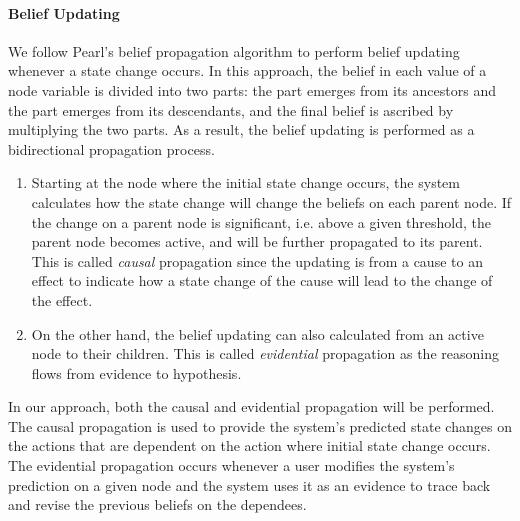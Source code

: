 \paragraph*{Belief Updating} %
\label{par:belief_updating}
We follow Pearl’s belief propagation algorithm \cite{pearl1988probabilistic} to perform belief updating whenever a state change occurs. In this approach, the belief in each value of a node variable is divided into two parts: the part emerges from its ancestors and the part emerges from its descendants, and the final belief is ascribed by multiplying the two parts. As a result, the belief updating is performed as a bidirectional propagation process. 
\begin{enumerate}
	\item Starting at the node where the initial state change occurs, the system calculates how the state change will change the beliefs on each parent node. If the change on a parent node is significant, i.e. above a given threshold, the parent node becomes active, and will be further propagated to its parent. This is called \emph{causal} propagation since the updating is from a cause to an effect to indicate how a state change of the cause will lead to the change of the effect. 
	\item On the other hand, the belief updating can also calculated from an active node to their children. This is called \emph{evidential} propagation as the reasoning flows from evidence to hypothesis.
\end{enumerate}

In our approach, both the causal and evidential propagation will be performed. The causal propagation is used to provide the system's predicted state changes on the actions that are dependent on the action where initial state change occurs. The evidential propagation occurs whenever a user modifies the system’s prediction on a given node and the system uses it as an evidence to trace back and revise the previous beliefs on the dependees.

